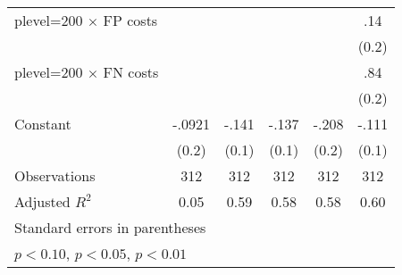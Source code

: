 \begin{table}[htbp]
\begin{tabular}{l*{5}{c}}
plevel=200 $\times$ FP costs&                  &                  &                  &                  &      .14         \\
                &                  &                  &                  &                  &    (0.2)         \\
plevel=200 $\times$ FN costs&                  &                  &                  &                  &      .84\sym{***}\\
                &                  &                  &                  &                  &    (0.2)         \\
Constant        &   -.0921         &    -.141\sym{*}  &    -.137         &    -.208         &    -.111         \\
                &    (0.2)         &    (0.1)         &    (0.1)         &    (0.2)         &    (0.1)         \\
\hline
Observations    &      312         &      312         &      312         &      312         &      312         \\
Adjusted \(R^{2}\)&     0.05         &     0.59         &     0.58         &     0.58         &     0.60         \\
\hline\hline
\multicolumn{6}{l}{\footnotesize Standard errors in parentheses}\\
\multicolumn{6}{l}{\footnotesize \sym{*} \(p<0.10\), \sym{**} \(p<0.05\), \sym{***} \(p<0.01\)}\\
\end{tabular}
\end{table}
